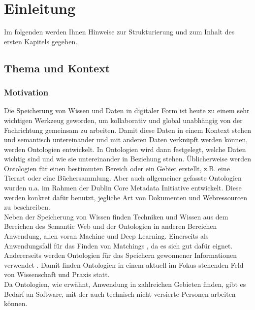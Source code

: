 %
\chapter{Einleitung}
\label{chap:introduction}

Im folgenden werden Ihnen Hinweise zur Strukturierung und zum Inhalt des ersten Kapitels gegeben.

\section{Thema und Kontext}

\subsection{Motivation}
Die Speicherung von Wissen und Daten in digitaler Form ist heute zu einem sehr
wichtigen Werkzeug geworden, um kollaborativ und global unabhängig von der Fachrichtung gemeinsam zu arbeiten. Damit diese Daten in einem Kontext stehen und semantisch untereinander und mit anderen Daten verknüpft werden können, werden Ontologien entwickelt. In Ontologien wird dann festgelegt, welche Daten wichtig sind und wie sie untereinander in Beziehung stehen. Üblicherweise werden Ontologien für einen bestimmten Bereich oder ein Gebiet erstellt, z.B. eine Tierart oder eine Büchersammlung. Aber auch allgemeiner gefasste Ontologien wurden u.a. im Rahmen der Dublin Core Metadata Initiative  entwickelt. Diese werden konkret dafür benutzt, jegliche Art von Dokumenten und Webressourcen zu beschreiben.\\
Neben der Speicherung von Wissen finden Techniken und Wissen aus dem Bereichen
des Semantic Web und der Ontologien in anderen Bereichen Anwendung, allen voran
Machine und Deep Learning. Einerseits als Anwendungsfall für das Finden von Matchings \cite{Doa16} , da es sich gut dafür eignet. Andererseits werden Ontologien für das Speichern gewonnener Informationen verwendet \cite{Pun07} . Damit finden Ontologien in einem aktuell im Fokus stehenden Feld von Wissenschaft und Praxis statt.\\
Da Ontologien, wie erwähnt, Anwendung in zahlreichen Gebieten finden, gibt es
Bedarf an Software, mit der auch technisch nicht-versierte Personen arbeiten können. \cite{Ber14}

